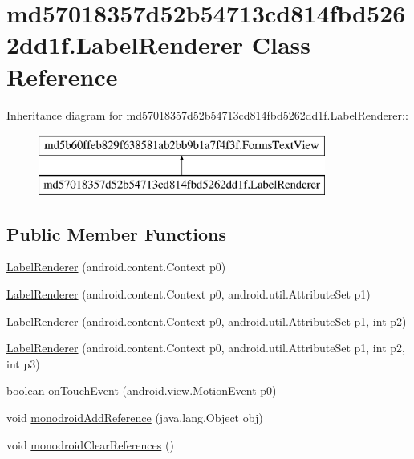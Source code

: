 \hypertarget{classmd57018357d52b54713cd814fbd5262dd1f_1_1_label_renderer}{
\section{md57018357d52b54713cd814fbd5262dd1f.LabelRenderer Class Reference}
\label{classmd57018357d52b54713cd814fbd5262dd1f_1_1_label_renderer}
}
Inheritance diagram for md57018357d52b54713cd814fbd5262dd1f.LabelRenderer::\begin{figure}[H]
\begin{center}
\leavevmode
\includegraphics[height=2cm]{classmd57018357d52b54713cd814fbd5262dd1f_1_1_label_renderer}
\end{center}
\end{figure}
\subsection*{Public Member Functions}
\begin{CompactItemize}
\item 
\hyperlink{classmd57018357d52b54713cd814fbd5262dd1f_1_1_label_renderer_aebdd1a385896c15116f4f28a7b14918}{LabelRenderer} (android.content.Context p0)
\item 
\hyperlink{classmd57018357d52b54713cd814fbd5262dd1f_1_1_label_renderer_daa775bc61d4d4d62b052709e7420a74}{LabelRenderer} (android.content.Context p0, android.util.AttributeSet p1)
\item 
\hyperlink{classmd57018357d52b54713cd814fbd5262dd1f_1_1_label_renderer_ca7fb08e1f26103c255dfaa50e9f0a16}{LabelRenderer} (android.content.Context p0, android.util.AttributeSet p1, int p2)
\item 
\hyperlink{classmd57018357d52b54713cd814fbd5262dd1f_1_1_label_renderer_6f9455e9a2f672bf746a3fa1819652aa}{LabelRenderer} (android.content.Context p0, android.util.AttributeSet p1, int p2, int p3)
\item 
boolean \hyperlink{classmd57018357d52b54713cd814fbd5262dd1f_1_1_label_renderer_29e4f37b703ed211f7df60679839d2bf}{onTouchEvent} (android.view.MotionEvent p0)
\item 
void \hyperlink{classmd57018357d52b54713cd814fbd5262dd1f_1_1_label_renderer_565940650659653853e6c97f4efb5f07}{monodroidAddReference} (java.lang.Object obj)
\item 
void \hyperlink{classmd57018357d52b54713cd814fbd5262dd1f_1_1_label_renderer_d17a308f68c51092a4967293f970fbaa}{monodroidClearReferences} ()
\end{CompactItemize}
